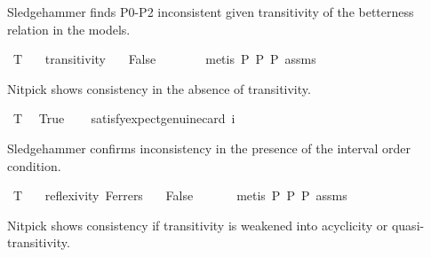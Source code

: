 \begin{isabellebody}
\begin{isamarkuptext}%
Sledgehammer finds P0-P2 inconsistent given transitivity of the betterness relation in the models.%
\end{isamarkuptext}\isamarkuptrue%
\isamarkupfalse%
\ T{}{\isacharcolon}{\kern0pt}\isanewline
\ \ \ transitivity\isanewline
\ \ \ False\ \isanewline
\ \ %
\isanewline
%
\isadelimproof
\ \ %
\endisadelimproof
%
\isatagproof
{}\isamarkupfalse%
\ {\isacharparenleft}{\kern0pt}metis\ P{}\ P{}\ P{}\ assms{\isacharparenright}{\kern0pt}%
\endisatagproof
{\isafoldproof}%
%
\isadelimproof
%
\endisadelimproof
%
\begin{isamarkuptext}%
Nitpick shows consistency in the absence of transitivity.%
\end{isamarkuptext}\isamarkuptrue%
\isamarkupfalse%
\ T{}{\isacharcolon}{\kern0pt}\isanewline
\ \ True\isanewline
\ \ \isamarkupfalse%
\ {\isacharbrackleft}{\kern0pt}satisfy{\isacharcomma}{\kern0pt}expect{\isacharequal}{\kern0pt}genuine{\isacharcomma}{\kern0pt}card\ i{\isacharequal}{\kern0pt}{}{\isacharbrackright}{\kern0pt}\ \ %
\isanewline
%
\isadelimproof
\ \ %
\endisadelimproof
%
\isatagproof
{}\isamarkupfalse%
%
\endisatagproof
{\isafoldproof}%
%
\isadelimproof
%
\endisadelimproof
%
\begin{isamarkuptext}%
Sledgehammer confirms inconsistency in the presence of the interval order condition.%
\end{isamarkuptext}\isamarkuptrue%
\isamarkupfalse%
\ T{}{\isacharcolon}{\kern0pt}\isanewline
\ \ \ reflexivity\ Ferrers\isanewline
\ \ \ False\isanewline
\ \ %
\isanewline
%
\isadelimproof
\ \ %
\endisadelimproof
%
\isatagproof
{}\isamarkupfalse%
\ {\isacharparenleft}{\kern0pt}metis\ P{}\ P{}\ P{}\ assms{\isacharparenleft}{\kern0pt}{}{\isacharparenright}{\kern0pt}{\isacharparenright}{\kern0pt}%
\endisatagproof
{\isafoldproof}%
%
\isadelimproof
%
\endisadelimproof
%
\begin{isamarkuptext}%
Nitpick shows consistency if transitivity is weakened into acyclicity or quasi-transitivity.%
\end{isamarkuptext}\isamarkuptrue%
\isamarkupfalse%

\end{isabellebody}
